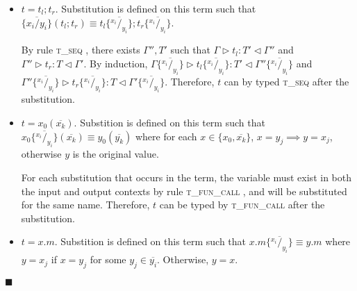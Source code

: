 \documentclass{article}
\newcommand{\tupd}{\textsc{t\_update} }
\newcommand{\tseq}{\textsc{t\_seq} }
\newcommand{\tfunc}{\textsc{t\_fun\_call} }
\newcommand{\typerule}[4]{#1 \triangleright #2 : #3 \triangleleft #4}
\newcommand{\subst}[3]{#3 \{\overline{^{#1}/_{#2}}\}}
\newcommand{\qed}{$\blacksquare$}
\newenvironment{proof}{\vspace{1ex}\noindent{\bf Proof}\hspace{0.5em}}
  {\hfill\qed\vspace{1ex}}
\begin{document}
\begin{proof}
\begin{itemize}
By rule \tupd, there exists
$T', T'' \Gamma_1, \Gamma_2$ such that
$\Gamma = \Gamma_1, x : T''$ and $\Gamma' = \Gamma_2, x : T'$ with
$\typerule{\Gamma_1}{t'}{T''}{\Gamma_2}$. 

By induction,
substitution can be performed on $t'$ such that
$\typerule{\subst{x_i}{y_i}{\Gamma_1}}{\subst{x_i}{y_i}{t'}}{T''}{\subst{x_i}{y_i}{\Gamma_2}}$. 

\begin{itemize}
\item If $x \in \overline{y_i}$,
$\subst{x_i}{y_i}{\Gamma_1}, x : T'' \equiv (\subst{x_i}{y_i}{\Gamma_1}), x_j : T''$
and
$\subst{x_i}{y_i}{\Gamma_2}, x : T' \equiv (\subst{x_i}{y_i}{\Gamma_2}), x_j : T'$.
Therefore, $t$ can by typed by \tupd after the substitution.
\item If $x \notin \overline{y_i}$, then
$\subst{x_i}{y_i}{\Gamma_1}, x : T'' \equiv (\subst{x_i}{y_i}{\Gamma_1}), x : T''$
and
$\subst{x_i}{y_i}{\Gamma_2}, x : T' \equiv (\subst{x_i}{y_i}{\Gamma_2}), x : T'$.
Therefore, $t$ can be typed by \tupd after the substitution.
\end{itemize}

\item $t = t_l ; t_r$.
Substitution is defined on this term such that
$\{ \overline{x_i / y_i} \} ( t_l ; t_r ) \equiv \subst{x_i}{y_i}{t_l} ; \subst{x_i}{y_i}{t_r}$.

By rule \tseq, there exists $\Gamma'', T'$ such that
$\typerule{\Gamma}{t_l}{T'}{\Gamma''}$ and
$\typerule{\Gamma''}{t_r}{T}{\Gamma'}$. By induction,
$\typerule{\subst{x_i}{y_i}{\Gamma}}{\subst{x_i}{y_i}{t_l}}{T'}{\subst{x_i}{y_i}{\Gamma''}}$ and
$\typerule{\subst{x_i}{y_i}{\Gamma''}}{\subst{x_i}{y_i}{t_r}}{T}{\subst{x_i}{y_i}{\Gamma'}}$.
Therefore, $t$ can by typed \tseq after the substitution.

\item $t = x_0 ( \overline{x_k} )$.
Substition is defined on this term such that
$\subst{x_i}{y_i}{x_0} ( \overline{x_k} ) \equiv y_0 ( \overline{y_k} )$
where for each $x \in \{ x_0, \overline{x_k} \}$,
$x = y_j \implies y = x_j$, otherwise $y$ is the original value.

For each substitution that occurs in the term, the variable must exist in
both the input and output contexts by rule \tfunc, and will be substituted
for the same name. Therefore, $t$ can be typed by \tfunc after the
substitution.

\item $t = x.m$.
Substition is defined on this term such that
$\subst{x_i}{y_i}{x.m} \equiv y.m$
where $y = x_j$ if $x = y_j$ for some $y_j \in \overline{y_i}$.
Otherwise, $y = x$.


\end{itemize}
\end{proof}
\end{document}
